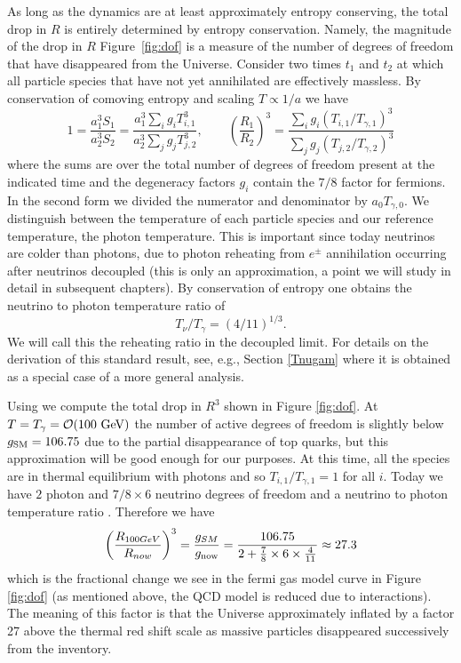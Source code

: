 As long as the dynamics are at least approximately entropy conserving, the total drop in $R$ is entirely determined by entropy conservation. Namely, the magnitude of the drop in $R$ Figure~\ref{fig:dof} is a measure of the number of degrees of freedom that have disappeared from the Universe. Consider two times $t_1$ and $t_2$ at which all particle species that have not yet annihilated are effectively massless. By conservation of comoving entropy and scaling $T\propto 1/a$ we have
\begin{equation}\label{r_ratio}
1=\frac{a_1^3S_{1}}{a_2^3 S_2}=\frac{a_1^3\sum_ig_i T_{i,1}^3}{a_2^3\sum_j g_j T_{j,2}^3},\qquad \left(\frac{R_1}{R_2}\right)^3=\frac{\sum_ig_i (T_{i,1}/T_{\gamma,1})^3}{\sum_j g_j (T_{j,2}/T_{\gamma,2})^3}
\end{equation}
where the sums are over the total number of degrees of freedom present at the indicated time and the degeneracy factors $g_i$ contain the $7/8$ factor for fermions. In the second form we divided the numerator and denominator by $a_{0}T_{\gamma,0}$. We distinguish between the temperature of each particle species and our reference temperature, the photon temperature. This is important since today neutrinos are colder than photons, due to photon reheating from $e^\pm$ annihilation occurring after neutrinos decoupled (this is only an approximation, a point we will study in detail in subsequent chapters). By conservation of entropy one obtains the neutrino to photon temperature ratio of
\begin{equation}\label{T_nu_T_gamma}
T_\nu/T_\gamma=({4}/{11})^{1/3}.
\end{equation}
We will call this the reheating ratio in the decoupled limit. For details on the derivation of this standard result, see, e.g., Section \ref{Tnugam} where it is obtained as a special case of a more general analysis.

Using  we compute the total drop in $R^3$ shown in Figure \ref{fig:dof}. At $T=T_\gamma=\mathcal{O}(100\text{ GeV})$ the number of active degrees of freedom is slightly below $g_{\rm SM}=106.75$ due to the partial disappearance of top quarks, but this approximation will be good enough for our purposes. At this time, all the species are in thermal equilibrium with photons and so $T_{i,1}/T_{\gamma,1}=1$ for all $i$. Today we have $2$ photon and $7/8\times 6$ neutrino degrees of freedom and a neutrino to photon temperature ratio . Therefore we have
\begin{equation}
\left(\frac{R_{100GeV}}{R_{now}}\right)^3= \frac{g_{SM}}{g_{\rm now}}=\frac{106.75}{2+\frac{7}{8}\times 6\times \frac{4}{11}}\approx 27.3
\end{equation}
which is the fractional change we see in the fermi gas model curve in Figure \ref{fig:dof} (as mentioned above, the QCD model is reduced due to interactions). The meaning of this factor is that the Universe approximately inflated by a factor 27 above the thermal red shift scale as massive particles disappeared successively from the inventory. 


